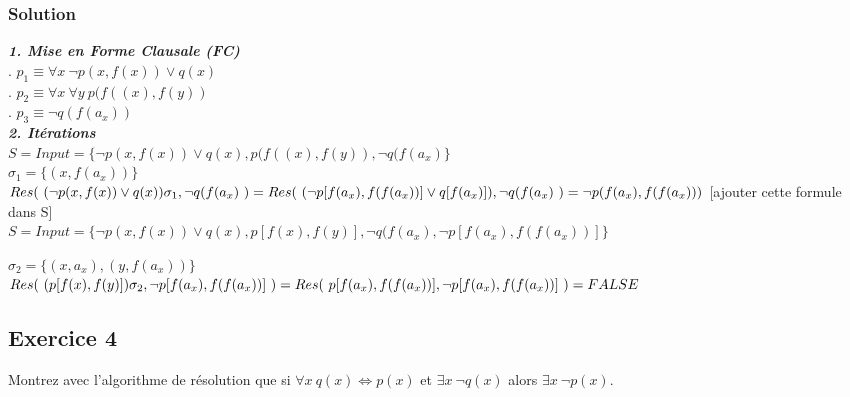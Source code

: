     \subsubsection*{Solution}

    \textbf{\textit{ 1. Mise en Forme Clausale (FC)}} \\
    . $p_1 \equiv \forall x \ \neg p(x, f(x)) \lor q(x) $\\
    . $p_2 \equiv \forall x \ \forall y \ p(f((x), f(y)) $\\
    . $p_3 \equiv \neg q(f(a_x))$ \\

    \textbf{\textit{2. Itérations }} \\
    $ S = Input = \{ \neg p(x, f(x)) \lor q(x), p(f((x), f(y)), \neg q(f(a_x) \} $ \\
    $ \sigma_1 = \{ (x, f(a_x)) \} $ \\
    $ Res( \ ( \neg p(x, f(x)) \lor q(x))\sigma_1, \neg q(f(a_x) \ ) = Res( \ ( \neg p[f(a_x), f(f(a_x))] \lor q[f(a_x)] ), \neg q(f(a_x)  \ ) \\ = \neg p(f(a_x), f(f(a_x))) $  [ajouter cette formule dans S] \\
    $ S = Input = \{ \neg p(x, f(x)) \lor q(x), p[f(x), f(y)], \neg q(f(a_x), \neg p[f(a_x), f(f(a_x))] \} $

    \noindent $ \sigma_{2} = \{ (x,a_x), (y,f(a_x) ) \}$\\
    $ Res( \ (p[f(x), f(y)])\sigma_2, \neg p[f(a_x), f(f(a_x))] \ ) \\ = Res( \ p[f(a_x), f(f(a_x))], \neg p[f(a_x), f(f(a_x))] \ ) = FALSE $\\



\subsection*{Exercice 4}
Montrez avec l'algorithme de r\'{e}solution que si $\forall x \ q(x) \Leftrightarrow p(x)$ et $\exists x \ \neg q(x)$ alors $\exists x \ \neg p(x)$.

